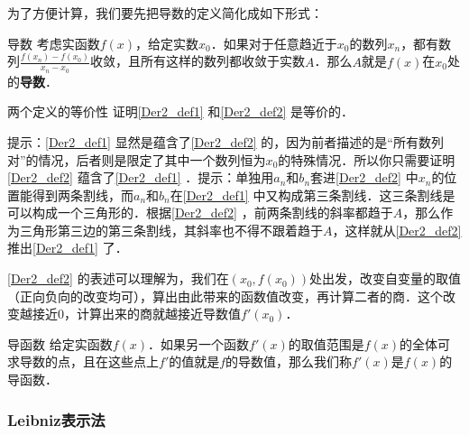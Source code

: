 


为了方便计算，我们要先把导数的定义简化成如下形式：

\begin{definition}{导数}\label{Der2_def2}
考虑实函数$f(x)$，给定实数$x_0$．如果对于任意趋近于$x_0$的数列$x_n$，都有数列$\frac{f(x_n)-f(x_0)}{x_n-x_0}$收敛，且所有这样的数列都收敛于实数$A$．那么$A$就是$f(x)$在$x_0$处的\textbf{导数}．
\end{definition}

\begin{exercise}{两个定义的等价性}
证明\autoref{Der2_def1} 和\autoref{Der2_def2} 是等价的．

提示：\autoref{Der2_def1} 显然是蕴含了\autoref{Der2_def2} 的，因为前者描述的是“所有数列对”的情况，后者则是限定了其中一个数列恒为$x_0$的特殊情况．所以你只需要证明\autoref{Der2_def2} 蕴含了\autoref{Der2_def1} ．提示：单独用$a_n$和$b_n$套进\autoref{Der2_def2} 中$x_n$的位置能得到两条割线，而$a_n$和$b_n$在\autoref{Der2_def1} 中又构成第三条割线．这三条割线是可以构成一个三角形的．根据\autoref{Der2_def2} ，前两条割线的斜率都趋于$A$，那么作为三角形第三边的第三条割线，其斜率也不得不跟着趋于$A$，这样就从\autoref{Der2_def2} 推出\autoref{Der2_def1} 了．
\end{exercise}


\autoref{Der2_def2} 的表述可以理解为，我们在$(x_0, f(x_0))$处出发，改变自变量的取值（正向负向的改变均可），算出由此带来的函数值改变，再计算二者的商．这个改变越接近$0$，计算出来的商就越接近导数值$f'(x_0)$．

\begin{definition}{导函数}
给定实函数$f(x)$．如果另一个函数$f'(x)$的取值范围是$f(x)$的全体可求导数的点，且在这些点上$f'$的值就是$f$的导数值，那么我们称$f'(x)$是$f(x)$的导函数．
\end{definition}

\subsubsection{Leibniz表示法}


